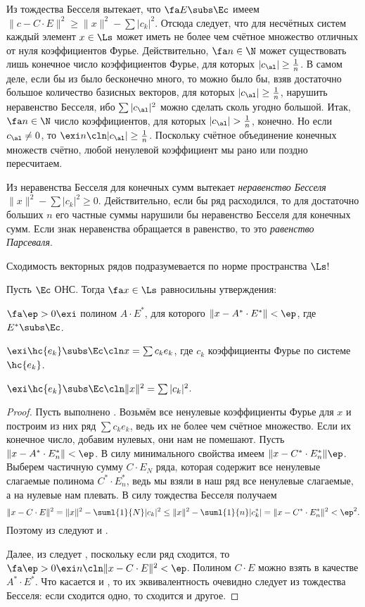 \documentclass[a4paper]{article}
\begin{document}
Из тождества Бесселя вытекает, что $\fa E \subs \Ec$ имеем $\|c - C\cdot E\|^2 \ge \|x\|^2 - \sum |c_k|^2$.
Отсюда следует, что для несчётных систем каждый элемент $x \in \Ls$ может иметь не более чем
счётное множество отличных от нуля коэффициентов Фурье. Действительно, $\fa n \in \N$ может
существовать лишь конечное число коэффициентов Фурье, для которых $|c_\al| \ge \frac{1}{n}$.
В самом деле, если бы из было бесконечно много, то можно было бы, взяв достаточно большое
количество базисных векторов, для которых $|c_\al| \ge \frac{1}{n}$,
нарушить неравенство Бесселя, ибо $\sum |c_\al|^2$ можно сделать сколь угодно большой. Итак,
$\fa n \in \N$ число коэффициентов, для которых
$|c_\al| > \frac{1}{n}$, конечно. Но если $c_\al \neq 0$, то $\exi n\cln |c_\al| \ge \frac{1}{n}$.
Поскольку счётное объединение конечных множеств счётно,
любой ненулевой коэффициент мы рано или поздно пересчитаем.

Из неравенства Бесселя для конечных сумм вытекает \emph{неравенство Бесселя}
$\|x\|^2 - \sum |c_k|^2 \ge 0$. Действительно, если бы ряд расходился, то для достаточно
больших $n$ его частные суммы нарушили бы неравенство Бесселя для конечных сумм.
Если знак неравенства обращается в равенство, то это \emph{равенство Парсеваля}.

\begin{note}
Сходимость векторных рядов подразумевается по норме пространства $\Ls$!
\end{note}

\begin{theorem}
Пусть $\Ec$ ОНС. Тогда $\fa x \in \Ls$ равносильны утверждения:

 $\fa \ep > 0 \exi$ полином $A\cdot E^*$, для которого $\|x - A^*\cdot E^*\|< \ep$, где $E^* \subs \Ec$.

 $\exi \hc{e_k} \subs \Ec\cln x = \sum c_k e_k$, где $c_k$ коэффициенты Фурье по системе $\hc{e_k}$.

 $\exi \hc{e_k} \subs \Ec\cln \|x\|^2 = \sum |c_k|^2$.
\end{theorem}
\begin{proof}
Пусть выполнено . Возьмём все ненулевые коэффициенты Фурье для $x$ и построим из них ряд $\sum c_k e_k$,
ведь их не более чем счётное множество. Если их конечное число, добавим нулевых, они нам не помешают.
Пусть $\|x - A^*\cdot E^*_n\| < \ep$. В силу минимального свойства имеем $\|x-C^*\cdot E^*_n\| \ep$.
Выберем частичную сумму $C\cdot E_N$ ряда, которая содержит все ненулевые слагаемые
полинома $C^*\cdot E^*_n$, ведь мы взяли в наш ряд все ненулевые слагаемые, а на нулевые нам
плевать. В силу тождества Бесселя получаем
$$\|x - C\cdot E\|^2 = \|x\|^2 - \suml{1}{N}|c_k|^2 \le \|x\|^2 - \suml{1}{n}|c_k^*|=
\|x-C^*\cdot E^*_n\|^2 < \ep^2.$$
Поэтому из  следуют  и .

Далее, из  следует , поскольку если ряд сходится, то
$\fa \ep > 0 \exi n\cln \|x - C\cdot E\|^2 < \ep$. Полином $C\cdot E$
можно взять в качестве $A^*\cdot E^*$. Что касается  и , то их эквивалентность
очевидно следует из тождества Бесселя: если сходится одно, то сходится и другое.
\end{proof}
\end{document}
